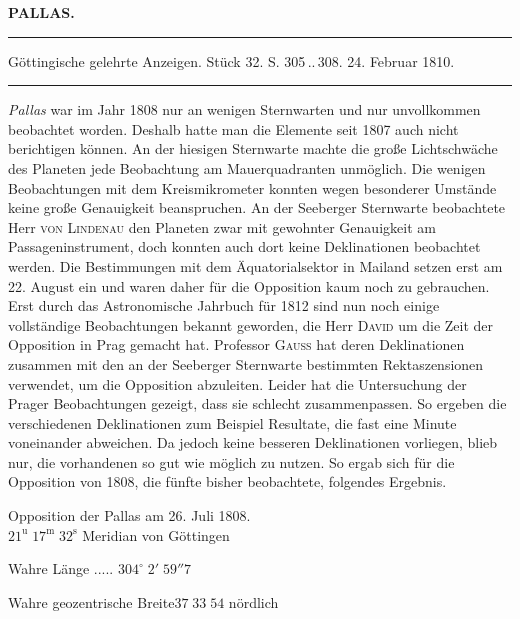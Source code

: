 \clearpage{}

\begin{center}\textbf{PALLAS.}\par\vspace{4pt}\hrule\vspace{4pt}\fontsize{10}{12}\selectfont Göttingische gelehrte Anzeigen. Stück 32. S. 305\,..\,308. 24. Februar 1810.\par\vspace{4pt}\hrule\vspace{4pt}\end{center}

\par\indent \emph{Pallas} war im Jahr 1808 nur an wenigen Sternwarten und nur unvollkommen beobachtet worden. Deshalb hatte man die Elemente seit 1807 auch nicht berichtigen können. An der hiesigen Sternwarte machte die große Lichtschwäche des Planeten jede Beobachtung am Mauerquadranten unmöglich. Die wenigen Beobachtungen mit dem Kreismikrometer konnten wegen besonderer Umstände keine große Genauigkeit beanspruchen. An der Seeberger Sternwarte beobachtete Herr \textsc{von Lindenau} den Planeten zwar mit gewohnter Genauigkeit am Passageninstrument, doch konnten auch dort keine Deklinationen beobachtet werden. Die Bestimmungen mit dem Äquatorialsektor in Mailand setzen erst am 22. August ein und waren daher für die Opposition kaum noch zu gebrauchen. Erst durch das Astronomische Jahrbuch für 1812 sind nun noch einige vollständige Beobachtungen bekannt geworden, die Herr \textsc{David} um die Zeit der Opposition in Prag gemacht hat. Professor \textsc{Gauss} hat deren Deklinationen zusammen mit den an der Seeberger Sternwarte bestimmten Rektaszensionen verwendet, um die Opposition abzuleiten. Leider hat die Untersuchung der Prager Beobachtungen gezeigt, dass sie schlecht zusammenpassen. So ergeben die verschiedenen Deklinationen zum Beispiel Resultate, die fast eine Minute voneinander abweichen. Da jedoch keine besseren Deklinationen vorliegen, blieb nur, die vorhandenen so gut wie möglich zu nutzen. So ergab sich für die Opposition von 1808, die fünfte bisher beobachtete, folgendes Ergebnis.

\begin{center}Opposition der Pallas am 26. Juli 1808.\\$21^{\text{u}}\;17^{\text{m}}\;32^{\text{s}}$ Meridian von Göttingen\par Wahre Länge .\;.\;.\;.\;.\; $304^\circ\;2'\;59''7$\par Wahre geozentrische Breite\quad $37\;33\;54$ nördlich\end{center}

